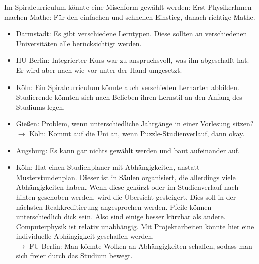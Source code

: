     Im Spiralcurriculum könnte eine Mischform gewählt werden: Erst PhysikerInnen machen Mathe: Für den einfachen und schnellen Einstieg, danach richtige Mathe.

    \begin{itemize}
      \item Darmstadt: Es gibt verschiedene Lerntypen. Diese sollten an verschiedenen Universitäten alle berücksichtigt werden.
      \item HU Berlin: Integrierter Kurs war zu anspruchsvoll, was ihn abgeschafft hat. Er wird aber nach wie vor unter der Hand umgesetzt.
      \item Köln: Ein Spiralcurriculum könnte auch verschieden Lernarten abbilden. Studierende könnten sich nach Belieben ihren Lernstil an den Anfang des Studiums legen.
      \item Gießen: Problem, wenn unterschiedliche Jahrgänge in einer Vorlesung sitzen? \\
            $\rightarrow$ Köln: Kommt auf die Uni an, wenn Puzzle-Studienverlauf, dann okay.
      \item Augsburg: Es kann gar nichts gewählt werden und baut aufeinander auf.
      \item Köln: Hat einen Studienplaner mit Abhängigkeiten, anstatt Musterstundenplan. Dieser ist in Säulen organisiert, die allerdings viele Abhängigkeiten haben. Wenn diese gekürzt oder im Studienverlauf nach hinten geschoben werden, wird die Übersicht gesteigert. Dies soll in der nächsten Reakkreditierung angesprochen werden.
            Pfeile können unterschiedlich dick sein. Also sind einige besser kürzbar als andere. Computerphysik ist relativ unabhängig. Mit Projektarbeiten könnte hier eine individuelle Abhängigkeit geschaffen werden. \\
            $\rightarrow$ FU Berlin: Man könnte Wolken an Abhängigkeiten schaffen, sodass man sich freier durch das Studium bewegt.


\end{itemize}
